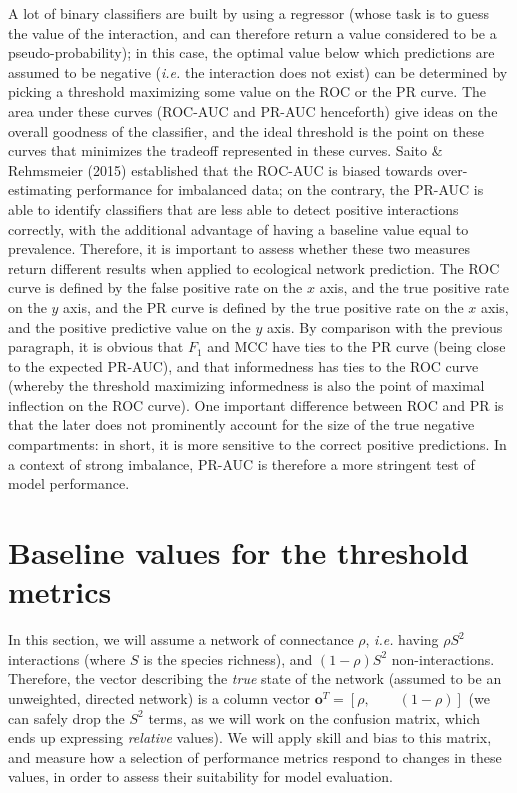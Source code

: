 \documentclass[11pt]{article}
\begin{document}
A lot of binary classifiers are built by using a regressor (whose task
is to guess the value of the interaction, and can therefore return a
value considered to be a pseudo-probability); in this case, the optimal
value below which predictions are assumed to be negative (\emph{i.e.}
the interaction does not exist) can be determined by picking a threshold
maximizing some value on the ROC or the PR curve. The area under these
curves (ROC-AUC and PR-AUC henceforth) give ideas on the overall
goodness of the classifier, and the ideal threshold is the point on
these curves that minimizes the tradeoff represented in these curves.
Saito \& Rehmsmeier (2015) established that the ROC-AUC is biased
towards over-estimating performance for imbalanced data; on the
contrary, the PR-AUC is able to identify classifiers that are less able
to detect positive interactions correctly, with the additional advantage
of having a baseline value equal to prevalence. Therefore, it is
important to assess whether these two measures return different results
when applied to ecological network prediction. The ROC curve is defined
by the false positive rate on the \(x\) axis, and the true positive rate
on the \(y\) axis, and the PR curve is defined by the true positive rate
on the \(x\) axis, and the positive predictive value on the \(y\) axis.
By comparison with the previous paragraph, it is obvious that \(F_1\)
and MCC have ties to the PR curve (being close to the expected PR-AUC),
and that informedness has ties to the ROC curve (whereby the threshold
maximizing informedness is also the point of maximal inflection on the
ROC curve). One important difference between ROC and PR is that the
later does not prominently account for the size of the true negative
compartments: in short, it is more sensitive to the correct positive
predictions. In a context of strong imbalance, PR-AUC is therefore a
more stringent test of model performance.

\hypertarget{baseline-values-for-the-threshold-metrics}{%
\section{Baseline values for the threshold
metrics}\label{baseline-values-for-the-threshold-metrics}}

In this section, we will assume a network of connectance \(\rho\),
\emph{i.e.} having \(\rho S^2\) interactions (where \(S\) is the species
richness), and \((1-\rho) S^2\) non-interactions. Therefore, the vector
describing the \emph{true} state of the network (assumed to be an
unweighted, directed network) is a column vector
\(\mathbf{o}^T = [\rho, \qquad (1-\rho)]\) (we can safely drop the
\(S^2\) terms, as we will work on the confusion matrix, which ends up
expressing \emph{relative} values). We will apply skill and bias to this
matrix, and measure how a selection of performance metrics respond to
changes in these values, in order to assess their suitability for model
evaluation.
\end{document}
